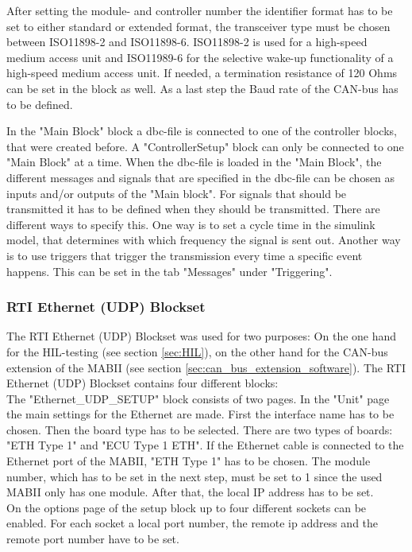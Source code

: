 \documentclass[ExampleMasters.tex]{subfiles}
\begin{document}
After setting the module- and controller number the identifier format has to be set to either standard or extended format, the transceiver type must be chosen between ISO11898-2 and ISO11898-6. ISO11898-2 is used for a high-speed medium access unit and ISO11989-6 for the selective wake-up functionality of a high-speed medium access unit. If needed, a termination resistance of 120 Ohms can be set in the block as well. As a last step the Baud rate of the CAN-bus has to be defined.


In the "Main Block" block a dbc-file is connected to one of the controller blocks, that were created before. A "ControllerSetup" block can only be connected to one "Main Block" at a time. When the dbc-file is loaded in the "Main Block", the different messages and signals that are specified in the dbc-file can be chosen as inputs and/or outputs of the "Main block". For signals that should be transmitted it has to be defined when they should be transmitted. There are different ways to specify this. One way is to set a cycle time in the simulink model, that determines with which frequency the signal is sent out. Another way is to use triggers that trigger the transmission every time a specific event happens. This can be set in the tab "Messages" under "Triggering".
\subsubsection{RTI Ethernet (UDP) Blockset}
The RTI Ethernet (UDP) Blockset was used for two purposes: On the one hand for the HIL-testing (see section \ref{sec:HIL}), on the other hand for the CAN-bus extension of the MABII (see section \ref{sec:can_bus_extension_software}). The RTI Ethernet (UDP) Blockset contains four different blocks:\\
The "Ethernet\_UDP\_SETUP" block consists of two pages. In the "Unit" page the main settings for the Ethernet are made. First the interface name has to be chosen. Then the board type has to be selected. There are two types of boards: "ETH Type 1" and "ECU Type 1 ETH". If the Ethernet cable is connected to the Ethernet port of the MABII, "ETH Type 1" has to be chosen. The module number, which has to be set in the next step, must be set to 1 since the used MABII only has one module.
After that, the local IP address has to be set.\\
On the options page of the setup block up to four different sockets can be enabled. For each socket a local port number, the remote ip address and the remote port number have to be set.\\
 
\end{document}
